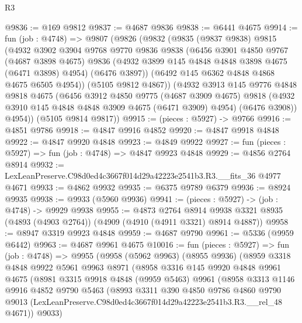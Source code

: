 \begin{lexlean}{R3}
\begin{coremodule}
@9836 := @169 @9812
@9837 := @4687 @9836
@9838 := @6441 @4675
@9914 := fun (job : @4748) =>
  @9807
    (@9826
      (@9832
        (@9835
          (@9837 @9838)
          @9815
          (@4932
            @3902
            @3904
            @9768
            @9770
            @9836
            @9838
            (@6456
              @3901
              @4850
              @9767
              (@4687 @3898 @4675)
              @9836
              (@4932 @3899 @145 @4848 @4848 @3898 @4675 (@6471 @3898) @4954)
              (@6476 @3897))
            (@6492 @145 @6362 @4848 @4868 @4675 @6505 @4954))
          (@5105 @9812 @4867))
        (@4932
          @3913
          @145
          @9776
          @4848
          @9818
          @4675
          (@6456
            @3912
            @4850
            @9775
            (@4687 @3909 @4675)
            @9818
            (@4932 @3910 @145 @4848 @4848 @3909 @4675 (@6471 @3909) @4954)
            (@6476 @3908))
          @4954))
      (@5105 @9814 @9817))
@9915 := (pieces : @5927) -> @9766
@9916 := @4851 @9786
@9918 := @4847 @9916 @4852
@9920 := @4847 @9918 @4848
@9922 := @4847 @9920 @4848
@9923 := @4849 @9922
@9927 := fun (pieces : @5927) => fun (job : @4748) => @4847 @9923 @4848
@9929 := @4856 @2764 @8914
@9932 := LexLeanPreserve.C98d0ed4c3667f014d29a42223e2541b3.R3.__fits_36 @4977 @4671
@9933 := @4862 @9932
@9935 := @6375 @9789 @6379
@9936 := @8924 @9935
@9938 := @9933 (@5960 @9936)
@9941 := (pieces : @5927) -> (job : @4748) -> @9929 @9938
@9955 := @4873
    @2764
    @8914
    @9938
    @3321
    @8935
    (@4893 (@4903 @2764))
    (@4909 (@4910 (@4911 @3321) @8914 @4887))
@9958 := @8947 @3319 @9923 @4848
@9959 := @4687 @9790
@9961 := @5336 (@9959 @6442)
@9963 := @4687 @9961 @4675
@10016 := fun (pieces : @5927) =>
  fun (job : @4748) =>
  @9955
    (@9958
      (@5962 @9963)
      (@8955 @9936)
      (@8959
        @3318
        @4848
        @9922
        @5961
        @9963
        @8971
        (@8958
          @3316
          @145
          @9920
          @4848
          @9961
          @4675
          (@8981
            @3315
            @9918
            @4848
            (@9959 @5463)
            @9961
            (@8958
              @3313
              @1146
              @9916
              @4852
              @9790
              @5463
              (@8993
                @3311
                @390
                @4850
                @9786
                @4860
                @9790
                @9013
                (LexLeanPreserve.C98d0ed4c3667f014d29a42223e2541b3.R3.__rel_48 @4671))
              @9033)

\end{coremodule}
\end{lexlean}
